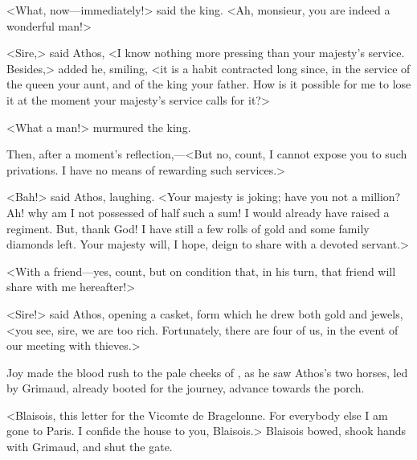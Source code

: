 <What, now—immediately!> said the king. <Ah, monsieur, you are indeed a wonderful man!>

<Sire,> said Athos, <I know nothing more pressing than your majesty's service. Besides,> added he, smiling, <it is a habit contracted long since, in the service of the queen your aunt, and of the king your father. How is it possible for me to lose it at the moment your majesty's service calls for it?>

<What a man!> murmured the king.

Then, after a moment's reflection,—<But no, count, I cannot expose you to such privations. I have no means of rewarding such services.>

<Bah!> said Athos, laughing. <Your majesty is joking; have you not a million? Ah! why am I not possessed of half such a sum! I would already have raised a regiment. But, thank God! I have still a few rolls of gold and some family diamonds left. Your majesty will, I hope, deign to share with a devoted servant.>

<With a friend—yes, count, but on condition that, in his turn, that friend will share with me hereafter!>

<Sire!> said Athos, opening a casket, form which he drew both gold and jewels, <you see, sire, we are too rich. Fortunately, there are four of us, in the event of our meeting with thieves.>

Joy made the blood rush to the pale cheeks of , as he saw Athos's two horses, led by Grimaud, already booted for the journey, advance towards the porch.

<Blaisois, this letter for the Vicomte de Bragelonne. For everybody else I am gone to Paris. I confide the house to you, Blaisois.> Blaisois bowed, shook hands with Grimaud, and shut the gate. 
